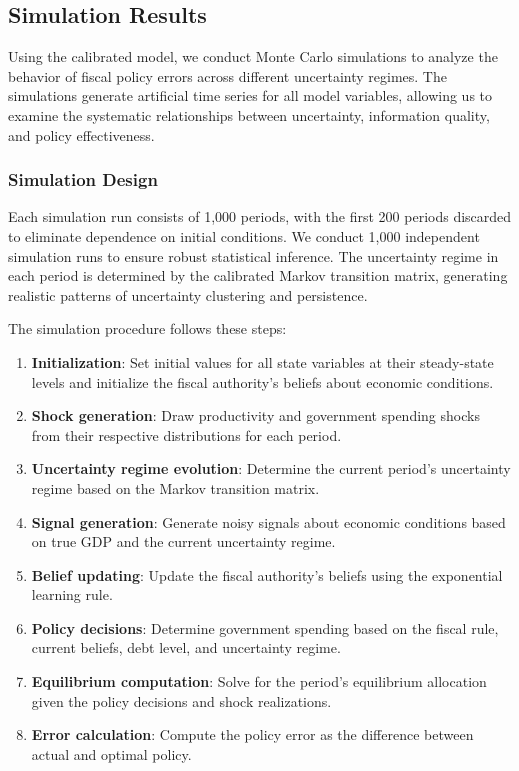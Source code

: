 \documentclass[5p,authoryear]{elsarticle}
\begin{document}
\subsection{Simulation Results}

Using the calibrated model, we conduct Monte Carlo simulations to analyze the behavior of fiscal policy errors across different uncertainty regimes. The simulations generate artificial time series for all model variables, allowing us to examine the systematic relationships between uncertainty, information quality, and policy effectiveness.

\subsubsection{Simulation Design}

Each simulation run consists of 1,000 periods, with the first 200 periods discarded to eliminate dependence on initial conditions. We conduct 1,000 independent simulation runs to ensure robust statistical inference. The uncertainty regime in each period is determined by the calibrated Markov transition matrix, generating realistic patterns of uncertainty clustering and persistence.

The simulation procedure follows these steps:

\begin{enumerate}
\item \textbf{Initialization}: Set initial values for all state variables at their steady-state levels and initialize the fiscal authority's beliefs about economic conditions.

\item \textbf{Shock generation}: Draw productivity and government spending shocks from their respective distributions for each period.

\item \textbf{Uncertainty regime evolution}: Determine the current period's uncertainty regime based on the Markov transition matrix.

\item \textbf{Signal generation}: Generate noisy signals about economic conditions based on true GDP and the current uncertainty regime.

\item \textbf{Belief updating}: Update the fiscal authority's beliefs using the exponential learning rule.

\item \textbf{Policy decisions}: Determine government spending based on the fiscal rule, current beliefs, debt level, and uncertainty regime.

\item \textbf{Equilibrium computation}: Solve for the period's equilibrium allocation given the policy decisions and shock realizations.

\item \textbf{Error calculation}: Compute the policy error as the difference between actual and optimal policy.
\end{enumerate}
\end{document}
